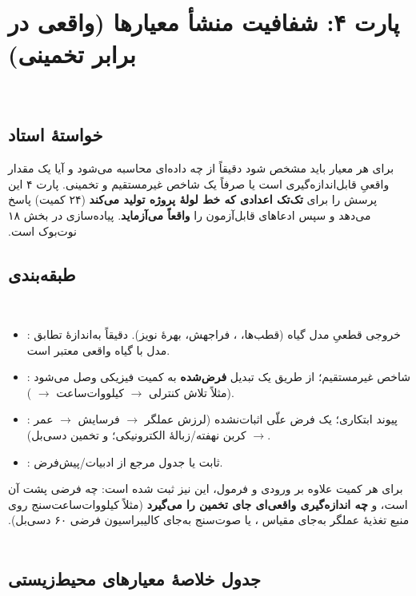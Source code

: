 ‫\documentclass[a4paper,12pt]{article}
\begin{document}
‫
‫\section{پارت ۴: شفافیت منشأ معیارها (واقعی در برابر تخمینی)}
‫
‫\subsection{خواستهٔ استاد}
‫برای هر معیار باید مشخص شود دقیقاً از چه داده‌ای محاسبه می‌شود و آیا یک مقدار
‫واقعیِ قابل‌اندازه‌گیری است یا صرفاً یک شاخص غیرمستقیم و تخمینی. پارت ۴ این
‫پرسش را برای \textbf{تک‌تک اعدادی که خط لولهٔ پروژه تولید می‌کند} (۲۴ کمیت)
‫پاسخ می‌دهد و سپس ادعاهای قابل‌آزمون را \textbf{واقعاً می‌آزماید}. پیاده‌سازی در
‫بخش ۱۸ نوت‌بوک است.
‫
‫\subsection{طبقه‌بندی}
‫\begin{itemize}
‫\item {}: خروجی قطعیِ مدل گیاه (قطب‌ها، ، فراجهش، بهرهٔ نویز). دقیقاً به‌اندازهٔ تطابق مدل با گیاه واقعی معتبر است.
‫\item {}: شاخص غیرمستقیم؛ از طریق یک تبدیل \textbf{فرض‌شده} به کمیت فیزیکی وصل می‌شود (مثلاً تلاش کنترلی $\to$ کیلووات‌ساعت $\to$ ).
‫\item {}: پیوند ابتکاری؛ یک فرض علّی اثبات‌نشده (لرزش عملگر $\to$ فرسایش $\to$ عمر $\to$ کربن نهفته/زبالهٔ الکترونیکی؛ و تخمین دسی‌بل).
‫\item {}: ثابت یا جدول مرجع از ادبیات/پیش‌فرض.
‫\end{itemize}
‫برای هر کمیت علاوه بر ورودی و فرمول، این نیز ثبت شده است: چه فرضی پشت آن است، و \textbf{چه اندازه‌گیری واقعی‌ای جای تخمین را می‌گیرد}
‫(مثلاً کیلووات‌ساعت‌سنج روی منبع تغذیهٔ عملگر به‌جای مقیاس ، یا صوت‌سنج  به‌جای کالیبراسیون فرضی ۶۰ دسی‌بل).
‫
‫\subsection{جدول خلاصهٔ معیارهای محیط‌زیستی}
\end{document}
